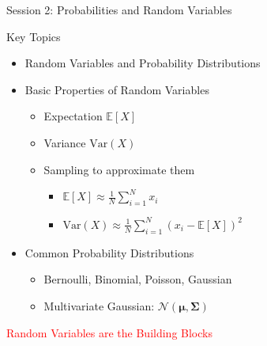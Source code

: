 \documentclass{beamer}
\begin{document}
\begin{frame}{Session 2: Probabilities and Random Variables}
  \begin{block}{Key Topics}
    \begin{itemize}
      \item Random Variables and Probability Distributions
      \item Basic Properties of Random Variables
        \begin{itemize}
        \item Expectation $\mathbb{E}[X]$
        \item Variance $\text{Var}(X)$
        \item Sampling to approximate them
          \begin{itemize}
          \item $\mathbb{E}[X] \approx \frac{1}{N} \sum_{i=1}^{N} x_i$
          \item $\text{Var}(X) \approx \frac{1}{N} \sum_{i=1}^{N} (x_i - \mathbb{E}[X])^2$
          \end{itemize}
        \end{itemize}
      \item Common Probability Distributions
        \begin{itemize}
          \item Bernoulli, Binomial, Poisson, Gaussian
          \item Multivariate Gaussian: $\mathcal{N}(\boldsymbol{\mu}, \boldsymbol{\Sigma})$
        \end{itemize}
    \end{itemize}
  \end{block}
  \vfill
  \centering
  \textcolor{red}{\large Random Variables are the Building Blocks}
\end{frame}
\end{document}
